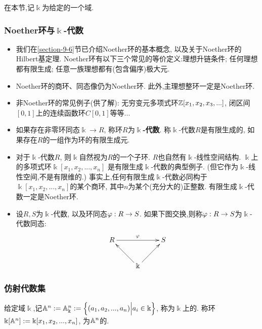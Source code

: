 \documentclass[oneside,a4papar,11pt,UTF8]{book}
\begin{document}
在本节,记$\Bbbk$为给定的一个域.

\subsubsection{Noether环与$\Bbbk$-代数}

\begin{itemize}
  \item 我们在\ref{section-9-6}节已介绍Noether环的基本概念,
  以及关于Noether环的Hilbert基定理.
  Noether环有以下三个常见的等价定义:理想升链条件;
  任何理想都有限生成;
  任意一族理想都有(包含偏序)极大元.

  \item Noether环的商环、同态像仍为Noether环.
  此外,主理想整环一定是Noether环.

  \item 非Noether环的常见例子(供了解):
  无穷变元多项式环$\mathbb{Z}[x_1,x_2,x_3,...]$,
  闭区间$[0,1]$上的连续函数环$C[0,1]$等等...

  \item 如果存在非零环同态$\Bbbk\to R$,
  称环$R$为\textbf{$\Bbbk$-代数}.
  称$\Bbbk$-代数$R$是有限生成的,
  如果存在$R$的一组作为环的有限生成元.

  \item 对于$\Bbbk$-代数$R$,
  则$\Bbbk$自然视为$R$的一个子环.
  $R$也自然有$\Bbbk$-线性空间结构.
  $\Bbbk$上的多项式环$\Bbbk[x_1,x_2,...,x_n]$
  是有限生成$\Bbbk$-代数的典型例子.
  (但它作为$\Bbbk$-线性空间,不是有限维的.)
  事实上,任何有限生成$\Bbbk$-代数必同构于
  $\Bbbk[x_1,x_2,...,x_n]$的某个商环,
  其中$n$为某个(充分大的)正整数.
  有限生成$\Bbbk$-代数一定是Noether环.

  \item 设$R,S$为$\Bbbk$-代数,
  以及环同态$\varphi:R\to S$.
  如果下图交换,则称$\varphi:R\to S$为$\Bbbk$-代数同态:
  \[\xymatrix{
     R\ar[rr]^{\fai}
    &
    &S
  \\
    &\Bbbk
      \ar[ul]
      \ar[ur]
    &
  }\]
\end{itemize}

\subsubsection{仿射代数集}

给定域$\Bbbk$,记$\mathbb{A}^n:=\mathbb{A}_{\Bbbk}^n
:=\Big\{ (a_1,a_2,...,a_n) \Big| a_i\in\Bbbk \Big\}$,
称为$\Bbbk$上的.
称环$\Bbbk[\mathbb{A}^n]:=\Bbbk[x_1,x_2,...,x_n]$,
为$\mathbb{A}^n$的.
\end{document}
